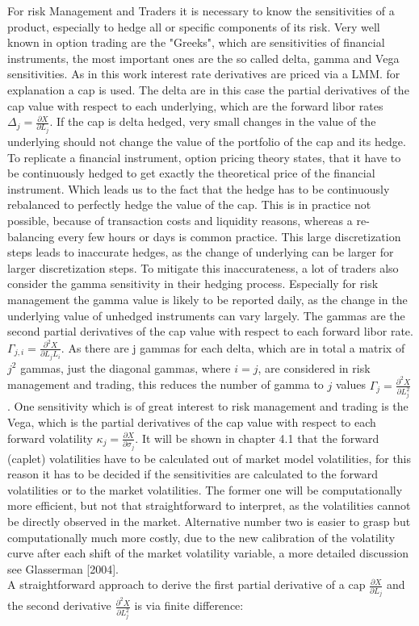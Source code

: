 \documentclass[11pt]{article}
\numberwithin{equation}{subsection}
\begin{document}
For risk Management and Traders it is necessary to know the sensitivities of a product, especially to hedge all or specific components of its risk. Very well known in option trading are the "Greeks", which are sensitivities of financial instruments, the most important ones are the so called delta, gamma and Vega sensitivities. As in this work interest rate derivatives are priced via a LMM. for explanation a cap is used. The delta are in this case the partial derivatives of the cap value with respect to each underlying, which are the forward libor rates  \(\Delta_j = \frac{\partial X}{\partial L_j}\). If the cap is delta hedged, very small changes in the value of the underlying should not change the value of the portfolio of the cap and its hedge. To replicate a financial instrument, option pricing theory states, that it have to be continuously hedged to get exactly the theoretical price of the financial instrument. Which leads us to the fact that the hedge has to be continuously rebalanced to perfectly hedge the value of the cap. This is in practice not possible, because of transaction costs and liquidity reasons, whereas a re-balancing every few hours or days is common practice. This large discretization steps leads to inaccurate hedges, as the change of underlying can be larger for larger discretization steps. To mitigate this inaccurateness, a lot of traders also consider the gamma sensitivity in their hedging process. Especially for risk management the gamma value is likely to be reported daily, as the change in the underlying value of unhedged instruments can vary largely. The gammas are the second partial derivatives of the cap value with respect to each forward libor rate. \(\Gamma_{j,i}=\frac{\partial^2 X}{\partial L_j L_i}\). As there are j gammas for each delta, which are in total a matrix of \(j^2\) gammas, just the diagonal gammas, where \(i=j\), are considered in risk management and trading, this reduces the number of gamma to \(j\) values \(\Gamma_{j}=\frac{\partial^2 X}{\partial L_j^2}\). One sensitivity which is of great interest to risk management and trading is the Vega, which is the partial derivatives of the cap value with respect to each forward volatility \(\kappa_j=\frac{\partial X}{\partial \sigma_{j}}\). It will be shown in chapter 4.1 that the forward (caplet) volatilities have to be calculated out of market model volatilities, for this reason it has to be decided if the sensitivities are calculated to the forward volatilities or to the market volatilities. The former one will be computationally more efficient, but not that straightforward to interpret, as the volatilities cannot be directly observed in the market. Alternative number two is easier to grasp but computationally much more costly, due to the new calibration of the volatility curve after each shift of the market volatility variable, a more detailed discussion see Glasserman [2004].\\
A straightforward approach to derive the first partial derivative of a cap \(\frac{\partial X}{\partial L_j}\) and the second derivative \(\frac{\partial^2 X}{\partial L_j^2}\) is via finite difference:
\end{document}
